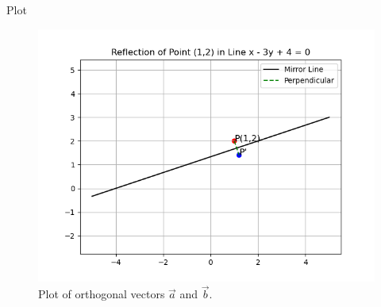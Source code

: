 \documentclass{beamer}
\begin{document}
\begin{frame}{Plot}
    \begin{figure}
        \centering
        \includegraphics[width=0.5\columnwidth]{../figs/plot.png}
        \caption{Plot of orthogonal vectors $\vec{a}$ and $\vec{b}$.}
        \label{fig:fig}
    \end{figure}
\end{frame}
\end{document}
